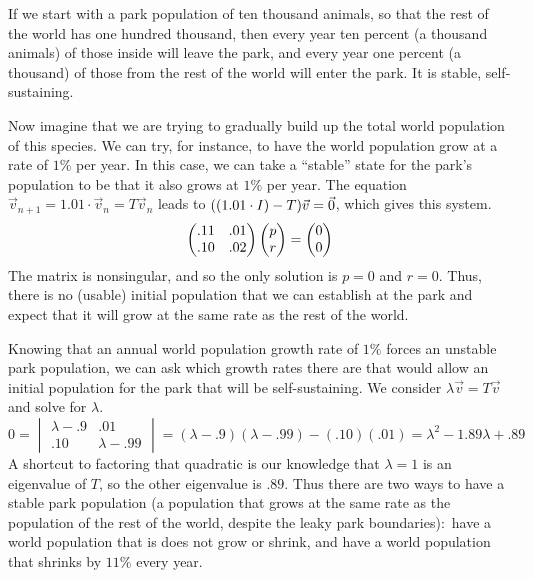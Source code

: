 If we start with a park population of ten thousand animals,
so that the rest of the world has one hundred thousand, then every year 
ten percent (a thousand animals) of those inside will leave the park, 
and every year one percent (a thousand) of those from the rest of
the world will enter the park.
It is stable, self-sustaining. 

Now imagine that we are trying to gradually build 
up the total world population of this species.
We can try, for instance, to have the world population grow at a rate
of $1\%$ per year.
In this case, we can take a ``stable'' state for the park's population to 
be that it also grows at $1\%$ per year.   
The equation $\vec{v}_{n+1}=1.01\cdot\vec{v}_n=T\vec{v}_{n}$ leads to 
$((1.01\cdot I)-T)\vec{v}=\vec{0}$, which gives this system. 
\begin{equation*}
  \begin{pmatrix}
     .11  &.01  \\
     .10  &.02
  \end{pmatrix}
  \begin{pmatrix} p \\ r \end{pmatrix}=
  \begin{pmatrix} 0 \\ 0 \end{pmatrix}
\end{equation*}
The matrix is nonsingular, and so the only solution is $p=0$ and 
$r=0$.
Thus, there is no (usable) initial population that 
we can establish at the park 
and expect that it will grow at the same rate as the rest of the world.

Knowing that an annual world population growth rate of $1\%$ forces an
unstable park population,
we can ask which growth rates there are that would 
allow an initial population for
the park that will be self-sustaining.
We consider $\lambda\vec{v}=T\vec{v}$ and solve for $\lambda$.
\begin{equation*}
  0=\begin{vmatrix}
    \lambda-.9  &.01  \\
    .10         &\lambda-.99
  \end{vmatrix}
  =(\lambda-.9)(\lambda-.99)-(.10)(.01)
  =\lambda^2-1.89\lambda+.89
\end{equation*}
A shortcut to factoring that quadratic is our knowledge that $\lambda=1$
is an eigenvalue of $T$, so the other eigenvalue is $.89$.
Thus there are two ways to have a stable park population (a population that
grows at the same rate as the population of the rest of the world, despite
the leaky park boundaries):~have a world population that is does not 
grow or shrink, and have a world population that shrinks by $11\%$ every year.
 
